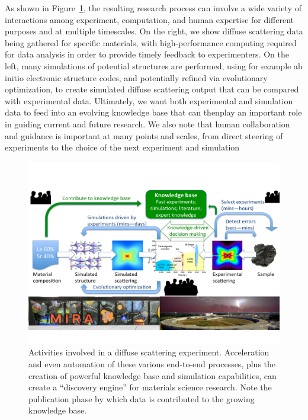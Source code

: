\documentclass{aip-cp}
\begin{document}
As shown in Figure~\ref{fig:diffuse}, the resulting research process can involve a wide variety of interactions among experiment, computation, and human expertise for different purposes and at multiple timescales. 
On the right, we show diffuse scattering data being gathered for specific materials, with high-performance computing required for data analysis in order to provide timely feedback to experimenters. 
On the left, 
many simulations of potential structures are performed, using for example ab initio electronic structure codes, 
and potentially refined via evolutionary optimization, 
to create simulated diffuse scattering output that can be compared with experimental data. 
Ultimately, we want both experimental and simulation data to feed into an evolving knowledge base that can thenplay an important role in guiding current and future research. 
We also note that human collaboration and guidance is important at many points and scales, from direct steering of experiments to the choice of the next experiment and simulation 


\begin{figure}[h]
  \centerline{\includegraphics[width=6in,trim=0 2.6in 0 1.5in,clip]{Figs/diffuse.png}}
  \caption{Activities involved in a diffuse scattering experiment. 
  Acceleration and even automation of these various end-to-end processes, plus the creation of powerful knowledge base and simulation capabilities, can create a ``discovery engine'' for materials science research. 
  Note the publication phase by which data is contributed to the growing knowledge base.\label{fig:diffuse}}
\end{figure}
\end{document}
